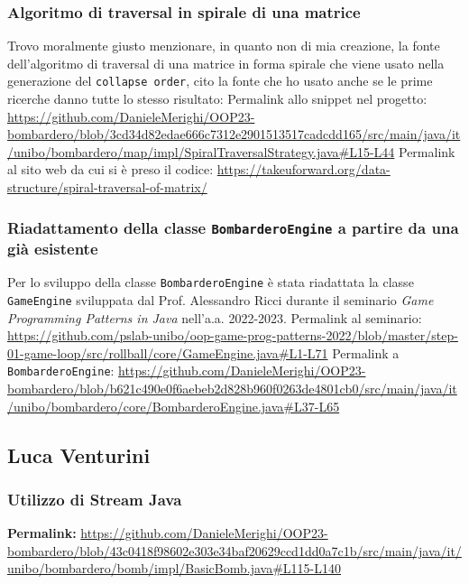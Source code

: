 \documentclass[a4paper,12pt]{report}
\begin{document}
\subsubsection{Algoritmo di traversal in spirale di una matrice}
Trovo moralmente giusto menzionare, in quanto non di mia creazione, la fonte dell'algoritmo di traversal di una matrice in forma spirale che viene usato nella generazione del \texttt{collapse order}, cito la fonte che ho usato anche se le prime ricerche danno tutte lo stesso risultato:
\newline
Permalink allo snippet nel progetto: \url{https://github.com/DanieleMerighi/OOP23-bombardero/blob/3cd34d82edae666c7312e2901513517cadcdd165/src/main/java/it/unibo/bombardero/map/impl/SpiralTraversalStrategy.java#L15-L44}
\newline
Permalink al sito web da cui si è preso il codice: \url{https://takeuforward.org/data-structure/spiral-traversal-of-matrix/}

\subsubsection{Riadattamento della classe \texttt{BombarderoEngine} a partire da una già esistente}
Per lo sviluppo della classe \texttt{BombarderoEngine} è stata riadattata la classe \texttt{GameEngine} sviluppata dal Prof. Alessandro Ricci durante il seminario \textit{Game Programming Patterns in Java} nell'a.a. 2022-2023.
\newline
Permalink al seminario: \url{https://github.com/pslab-unibo/oop-game-prog-patterns-2022/blob/master/step-01-game-loop/src/rollball/core/GameEngine.java#L1-L71}
\newline
Permalink a \texttt{BombarderoEngine}: \url{https://github.com/DanieleMerighi/OOP23-bombardero/blob/b621c490e0f6aebeb2d828b960f0263de4801cb0/src/main/java/it/unibo/bombardero/core/BombarderoEngine.java#L37-L65}

\subsection{Luca Venturini}

\subsubsection{Utilizzo di Stream Java}
\textbf{Permalink:} \url{https://github.com/DanieleMerighi/OOP23-bombardero/blob/43c0418f98602e303e34baf20629ccd1dd0a7c1b/src/main/java/it/unibo/bombardero/bomb/impl/BasicBomb.java#L115-L140}
\end{document}

